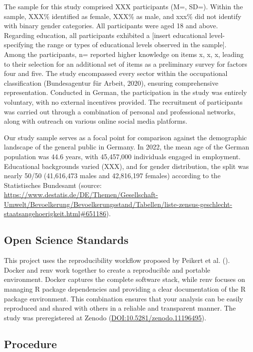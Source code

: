 \documentclass[
  12pt,
  a4paper,
  twoside]{article}
\begin{document}
The sample for this study comprised XXX participants (M=, SD=). Within
the sample, XXX\% identified as female, XXX\% as male, and xxx\% did not
identify with binary gender categories. All participants were aged 18
and above. Regarding education, all participants exhibited a {[}insert
educational level- specifying the range or types of educational levels
observed in the sample{]}. Among the participants, n= reported higher
knowledge on items x, x, x, leading to their selection for an additional
set of items as a preliminary survey for factors four and five. The
study encompassed every sector within the occupational classification
(Bundesagentur für Arbeit, 2020), ensuring comprehensive representation.
Conducted in German, the participation in the study was entirely
voluntary, with no external incentives provided. The recruitment of
participants was carried out through a combination of personal and
professional networks, along with outreach on various online social
media platforms.

Our study sample serves as a focal point for comparison against the
demographic landscape of the general public in Germany. In 2022, the
mean age of the German population was 44.6 years, with 45,457,000
individuals engaged in employment. Educational backgrounds varied (XXX),
and for gender distribution, the split was nearly 50/50 (41,616,473
males and 42,816,197 females) according to the Statistisches Bundesamt
(source:
\url{https://www.destatis.de/DE/Themen/Gesellschaft-Umwelt/Bevoelkerung/Bevoelkerungsstand/Tabellen/liste-zensus-geschlecht-staatsangehoerigkeit.html\#651186}).

\subsection{Open Science Standards}\label{open-science-standards}

This project uses the reproducibility workflow proposed by Peikert et
al. (). Docker and renv work together to
create a reproducible and portable environment. Docker captures the
complete software stack, while renv focuses on managing R package
dependencies and providing a clear documentation of the R package
environment. This combination ensures that your analysis can be easily
reproduced and shared with others in a reliable and transparent manner.
The study was preregistered at Zenodo
(\url{DOI:10.5281/zenodo.11196495}).

\subsection{Procedure}\label{procedure}
\end{document}
